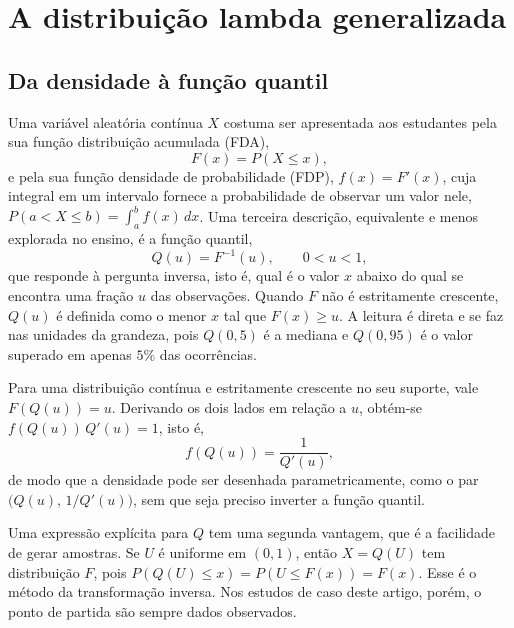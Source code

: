 
\section{A distribuição lambda generalizada}\label{sec:gld}

\subsection{Da densidade à função quantil}

Uma variável aleatória contínua $X$ costuma ser apresentada aos estudantes pela sua função distribuição acumulada (FDA),
\begin{equation}
    F(x) = P(X \leq x),
\end{equation}
e pela sua função densidade de probabilidade (FDP), $f(x) = F'(x)$, cuja integral em um intervalo fornece a probabilidade de observar um valor nele, $P(a < X \leq b) = \int_a^b f(x)\,dx$. Uma terceira descrição, equivalente e menos explorada no ensino, é a função quantil,
\begin{equation}
    Q(u) = F^{-1}(u), \qquad 0 < u < 1,
    \label{eq:quantil}
\end{equation}
que responde à pergunta inversa, isto é, qual é o valor $x$ abaixo do qual se encontra uma fração $u$ das observações. Quando $F$ não é estritamente crescente, $Q(u)$ é definida como o menor $x$ tal que $F(x) \geq u$. A leitura é direta e se faz nas unidades da grandeza, pois $Q(0{,}5)$ é a mediana e $Q(0{,}95)$ é o valor superado em apenas $5\%$ das ocorrências.

Para uma distribuição contínua e estritamente crescente no seu suporte, vale $F(Q(u)) = u$. Derivando os dois lados em relação a $u$, obtém-se $f(Q(u))\,Q'(u) = 1$, isto é,
\begin{equation}
    f(Q(u)) = \frac{1}{Q'(u)},
    \label{eq:densidade_quantil}
\end{equation}
de modo que a densidade pode ser desenhada parametricamente, como o par $\big(Q(u),\, 1/Q'(u)\big)$, sem que seja preciso inverter a função quantil.

Uma expressão explícita para $Q$ tem uma segunda vantagem, que é a facilidade de gerar amostras. Se $U$ é uniforme em $(0,1)$, então $X = Q(U)$ tem distribuição $F$, pois $P(Q(U) \leq x) = P(U \leq F(x)) = F(x)$. Esse é o método da transformação inversa. Nos estudos de caso deste artigo, porém, o ponto de partida são sempre dados observados.

